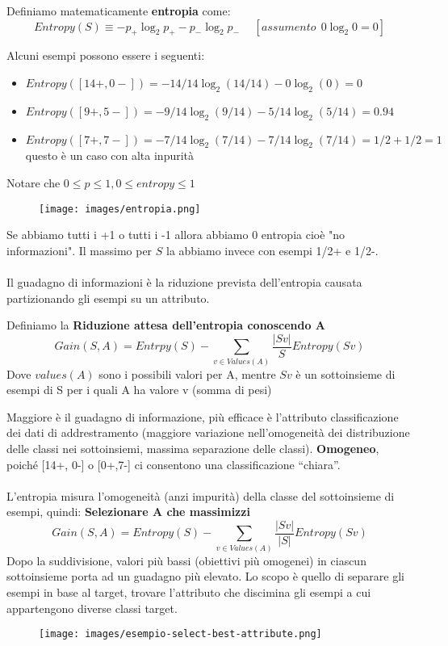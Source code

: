 \begin{definition}
    Definiamo matematicamente \textbf{entropia} come:
    $$Entropy(S) \equiv -p_+ \log_2 p_+ - p_- \log_2p_- \hspace{15pt} [assumento \:\: 0\log_2 0 = 0]$$
\end{definition}
\begin{example}
    Alcuni esempi possono essere i seguenti:
    \begin{itemize}
        \item $Entropy([14+, 0-]) = -14/14\log_2(14/14) - 0\log_2(0) = 0$
        \item $Entropy([9+, 5-]) = -9/14\log_2(9/14) - 5/14\log_2(5/14) = 0.94$
        \item $Entropy([7+, 7-]) = -7/14\log_2(7/14) - 7/14\log_2(7/14) = 1/2 + 1/2 = 1$ questo è un caso con alta inpurità
    \end{itemize}
\end{example}
\begin{note}
    Notare che $0 \leq p \leq 1, 0 \leq entropy \leq 1$
\end{note}
\begin{figure}[h!]
    \centering
    \texttt{[image: images/entropia.png]}
\end{figure}
Se abbiamo tutti i +1 o tutti i -1 allora abbiamo 0 entropia cioè "no informazioni". Il massimo per $S$ la abbiamo invece con esempi 1/2+ e 1/2-.\\\\
Il guadagno di informazioni è la riduzione prevista dell'entropia causata partizionando gli esempi su un attributo. 
\begin{definition}
    Definiamo la \textbf{Riduzione attesa dell’entropia conoscendo A}
    $$Gain(S, A) = Entrpy(S) - \sum_{v \in Values(A)}\frac{|Sv|}{S}Entropy(Sv)$$
    Dove $values(A)$ sono i possibili valori per A, mentre $Sv$ è un sottoinsieme di esempi di S per i quali A ha valore v (somma di pesi)
\end{definition}
\hspace{-15pt}Maggiore è il guadagno di informazione, più efficace è l'attributo classificazione dei dati di addrestramento (maggiore variazione nell'omogeneità dei distribuzione delle classi nei sottoinsiemi, massima separazione delle classi).
\textbf{Omogeneo}, poiché [14+, 0-] o [0+,7-] ci consentono una classificazione “chiara”.\\\\
L'entropia misura l'omogeneità (anzi impurità) della classe del sottoinsieme di esempi, quindi: \textbf{Selezionare A che massimizzi}
$$Gain(S, A) = Entropy(S) - \sum_{v \in Values(A)} \frac{|Sv|}{|S|} Entropy(Sv)$$
Dopo la suddivisione, valori più bassi (obiettivi più omogenei) in ciascun sottoinsieme porta ad un guadagno più elevato.
Lo scopo è quello di separare gli esempi in base al target, trovare l'attributo che discimina gli esempi a cui appartengono diverse classi target.
\begin{figure}[h!]
    \centering
    \texttt{[image: images/esempio-select-best-attribute.png]}
\end{figure}

